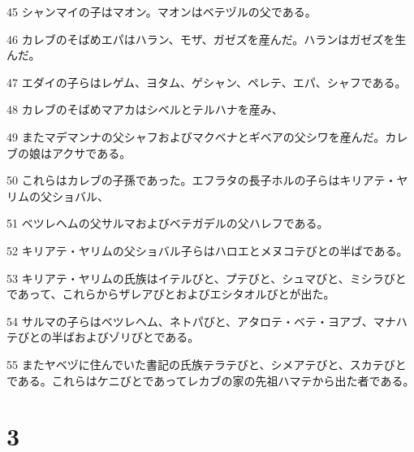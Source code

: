 \par 45 シャンマイの子はマオン。マオンはベテヅルの父である。
\par 46 カレブのそばめエパはハラン、モザ、ガゼズを産んだ。ハランはガゼズを生んだ。
\par 47 エダイの子らはレゲム、ヨタム、ゲシャン、ペレテ、エパ、シャフである。
\par 48 カレブのそばめマアカはシベルとテルハナを産み、
\par 49 またマデマンナの父シャフおよびマクベナとギベアの父シワを産んだ。カレブの娘はアクサである。
\par 50 これらはカレブの子孫であった。エフラタの長子ホルの子らはキリアテ・ヤリムの父ショバル、
\par 51 ベツレヘムの父サルマおよびベテガデルの父ハレフである。
\par 52 キリアテ・ヤリムの父ショバル子らはハロエとメヌコテびとの半ばである。
\par 53 キリアテ・ヤリムの氏族はイテルびと、プテびと、シュマびと、ミシラびとであって、これらからザレアびとおよびエシタオルびとが出た。
\par 54 サルマの子らはベツレヘム、ネトパびと、アタロテ・ベテ・ヨアブ、マナハテびとの半ばおよびゾリびとである。
\par 55 またヤベヅに住んでいた書記の氏族テラテびと、シメアテびと、スカテびとである。これらはケニびとであってレカブの家の先祖ハマテから出た者である。

\chapter{3}

